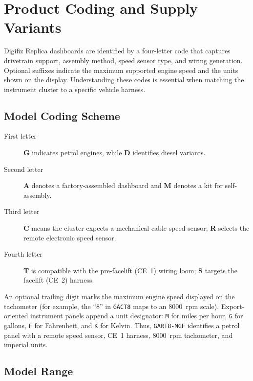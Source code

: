 \setcounter{chapter}{13}
\chapter{Product Coding and Supply Variants} \label{ch:notation}

Digifiz Replica dashboards are identified by a four-letter code that captures drivetrain support, assembly method, speed sensor type, and wiring generation.
Optional suffixes indicate the maximum supported engine speed and the units shown on the display.
Understanding these codes is essential when matching the instrument cluster to a specific vehicle harness.

\section{Model Coding Scheme}

\begin{description}
    \item[First letter] \textbf{G} indicates petrol engines, while \textbf{D} identifies diesel variants.
    \item[Second letter] \textbf{A} denotes a factory-assembled dashboard and \textbf{M} denotes a kit for self-assembly.
    \item[Third letter] \textbf{C} means the cluster expects a mechanical cable speed sensor; \textbf{R} selects the remote electronic speed sensor.
    \item[Fourth letter] \textbf{T} is compatible with the pre-facelift (CE~1) wiring loom; \textbf{S} targets the facelift (CE~2) harness.
\end{description}

An optional trailing digit marks the maximum engine speed displayed on the tachometer (for example, the ``8'' in \texttt{GACT8} maps to an 8000~rpm scale).
Export-oriented instrument panels append a unit designator: \texttt{M} for miles per hour, \texttt{G} for gallons, \texttt{F} for Fahrenheit, and \texttt{K} for Kelvin.
Thus, \texttt{GART8-MGF} identifies a petrol panel with a remote speed sensor, CE~1 harness, 8000~rpm tachometer, and imperial units.

\section{Model Range}


